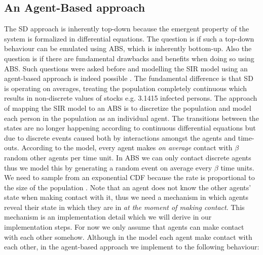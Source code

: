 \subsection*{An Agent-Based approach}
The SD approach is inherently top-down because the emergent property of the system is formalized in differential equations. The question is if such a top-down behaviour can be emulated using ABS, which is inherently bottom-up. Also the question is if there are fundamental drawbacks and benefits when doing so using ABS. Such questions were asked before and modelling the SIR model using an agent-based approach is indeed possible \cite{macal_agent-based_2010}. The fundamental difference is that SD is operating on averages, treating the population completely continuous which results in non-discrete values of stocks e.g. 3.1415 infected persons. The approach of mapping the SIR model to an ABS is to discretize the population and model each person in the population as an individual agent. The transitions between the states are no longer happening according to continuous differential equations but due to discrete events caused both by interactions amongst the agents and time-outs.
According to the model, every agent makes \textit{on average} contact with $\beta$ random other agents per time unit. In ABS we can only contact discrete agents thus we model this by generating a random event on average every $\beta$ time units. We need to sample from an exponential CDF because the rate is proportional to the size of the population \cite{borshchev_system_2004}. Note that an agent does not know the other agents' state when making contact with it, thus we need a mechanism in which agents reveal their state in which they are in \textit{at the moment of making contact}. This mechanism is an implementation detail which we will derive in our implementation steps. For now we only assume that agents can make contact with each other somehow. 
Although in the model each agent make contact with each other, in the agent-based approach we implement to the following behaviour:


